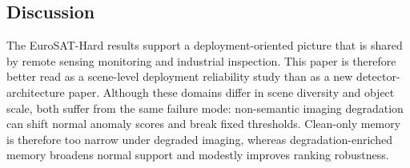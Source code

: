 \documentclass[remotesensing,article,submit,pdftex,moreauthors]{Definitions/mdpi}
\begin{document}
\FloatBarrier

\subsection{Discussion}
The EuroSAT-Hard results support a deployment-oriented picture that is shared by remote sensing monitoring and industrial inspection. This paper is therefore better read as a scene-level deployment reliability study than as a new detector-architecture paper. Although these domains differ in scene diversity and object scale, both suffer from the same failure mode: non-semantic imaging degradation can shift normal anomaly scores and break fixed thresholds. Clean-only memory is therefore too narrow under degraded imaging, whereas degradation-enriched memory broadens normal support and modestly improves ranking robustness.
\end{document}
